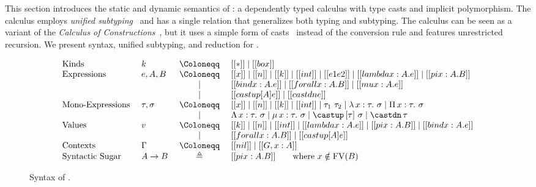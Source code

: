 \section{\System}
\label{sec:system}

This section introduces the static and dynamic semantics of
\name: a dependently typed calculus with type casts
and implicit polymorphism. The calculus employs
\emph{unified subtyping}~\cite{full}
and has a single relation that generalizes both typing and subtyping.
The calculus can be seen as a variant of the \emph{Calculus of Constructions}~\cite{coc},
but it uses a simple form of casts~\cite{isotype,yang2019pure} instead of the
conversion rule and features unrestricted recursion.
We present syntax, unified subtyping, and reduction for \name.

\begin{figure}[t]
\centering
\begin{equation*}
\begin{array}{llcl}
    \text{Kinds} & k & ~\Coloneqq ~ & [[*]] \mid [[box]] \\
    \text{Expressions} & e, A, B & ~ \Coloneqq ~ & [[x]] \mid [[n]] \mid [[k]] \mid [[int]] \mid [[e1 e2]] \mid [[lambda x : A. e]] \mid [[pi x : A. B]] \\
        & & \mid & [[bind x : A. e]] \mid [[forall x : A. B]] \mid [[mu x : A. e]] \\
        & & \mid & [[castup [A] e]] \mid [[castdn e]]   \\
    \text{Mono-Expressions} ~ & \tau, \sigma & ~ \Coloneqq ~ & [[x]] \mid [[n]] \mid [[k]] \mid [[int]] \mid \tau_1 ~ \tau_2 \mid \lambda \, x : \tau. ~ \sigma \mid \Pi \, x : \tau. ~ \sigma \\
        & & \mid & \Lambda \, x : \tau. ~ \sigma \mid \mu \, x : \tau. ~ \sigma \mid \castup \, [\tau]~ \sigma \mid \castdn \, \tau \\
    \text{Values} & v & ~ \Coloneqq ~ & [[k]] \mid [[n]] \mid [[int]] \mid [[lambda x : A. e]] \mid [[pi x : A. B]] \mid [[bind x : A. e]] \\
        & & \mid & [[forall x : A. B]] \mid [[castup [A] e]] \\
    \text{Contexts} & \Gamma & ~ \Coloneqq ~ & [[nil]] \mid [[G , x : A]] \\
    \text{Syntactic Sugar} ~ & A \rightarrow B & \triangleq & [[pi x : A. B]] \qquad \text{where} ~ x \notin \mathrm{FV}(B)
\end{array}
\end{equation*}
\caption{Syntax of \name.}
\label{fig:syntax}
\end{figure}
